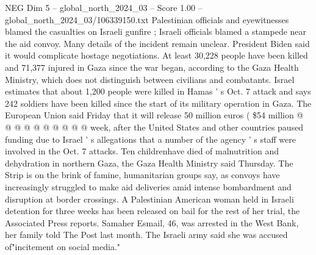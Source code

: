 \begin{textsample}{NEG Dim 5 – global\_north\_2024\_03 – Score 1.00 – global\_north\_2024\_03/106339150.txt}
Palestinian officials and eyewitnesses blamed the casualties on Israeli gunfire ; Israeli officials blamed a stampede near the aid convoy.
Many details of the incident remain unclear.
President Biden said it would complicate hostage negotiations.
At least 30,228 people have been killed and 71,377 injured in Gaza since the war began, according to the Gaza Health Ministry, which does not distinguish between civilians and combatants.
Israel estimates that about 1,200 people were killed in Hamas ' s Oct. 7 attack and says 242 soldiers have been killed since the start of its military operation in Gaza.
The European Union said Friday that it will release 50 million euros ( \$54 million @ @ @ @ @ @ @ @ @ @ week, after the United States and other countries paused funding due to Israel ' s allegations that a number of the agency ' s staff were involved in the Oct. 7 attacks.
Ten childrenhave died of malnutrition and dehydration in northern Gaza, the Gaza Health Ministry said Thursday.
The Strip is on the brink of famine, humanitarian groups say, as convoys have increasingly struggled to make aid deliveries amid intense bombardment and disruption at border crossings.
A Palestinian American woman held in Israeli detention for three weeks has been released on bail for the rest of her trial, the Associated Press reports.
Samaher Esmail, 46, was arrested in the West Bank, her family told The Post last month.
The Israeli army said she was accused of"incitement on social media."

\end{textsample}
